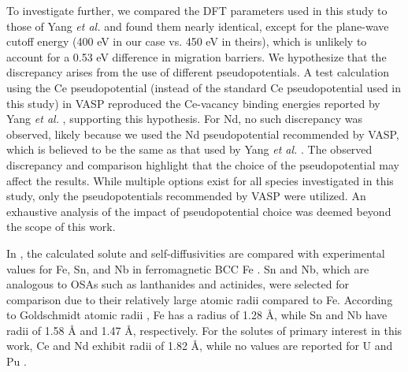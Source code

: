 \documentclass[preprint,12pt]{elsarticle}
\begin{document}
To investigate further, we compared the DFT parameters used in this study to those of Yang \textit{et al.} \cite{yang_significant_2023} and found them nearly identical, except for the plane-wave cutoff energy (400 eV in our case vs. 450 eV in theirs), which is unlikely to account for a 0.53 eV difference in migration barriers. We hypothesize that the discrepancy arises from the use of different pseudopotentials. A test calculation using the Ce pseudopotential (instead of the standard Ce pseudopotential used in this study) in VASP reproduced the Ce-vacancy binding energies reported by Yang \textit{et al.} \cite{yang_significant_2023}, supporting this hypothesis. For Nd, no such discrepancy was observed, likely because we used the Nd pseudopotential recommended by VASP, which is believed to be the same as that used by Yang \textit{et al.} \cite{yang_significant_2023}. The observed discrepancy and comparison highlight that the choice of the pseudopotential may affect the results. While multiple options exist for all species investigated in this study, only the pseudopotentials recommended by VASP were utilized. An exhaustive analysis of the impact of pseudopotential choice was deemed beyond the scope of this work. 

In , the calculated solute and self-diffusivities are compared with experimental values for Fe, Sn, and Nb in ferromagnetic BCC Fe \cite{lubbehusen1990self, hettich1977self, torres2000diffusion, herzig2002niobium}. Sn and Nb, which are analogous to OSAs such as lanthanides and actinides, were selected for comparison due to their relatively large atomic radii compared to Fe. According to Goldschmidt atomic radii \cite{brandes2013smithells}, Fe has a radius of 1.28 Å, while Sn and Nb have radii of 1.58 Å and 1.47 Å, respectively. For the solutes of primary interest in this work, Ce and Nd exhibit radii of 1.82 Å, while no values are reported for U and Pu \cite{brandes2013smithells}.
\end{document}
